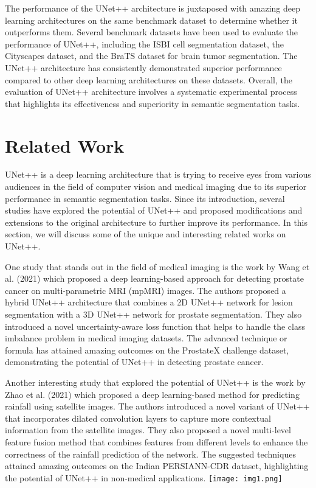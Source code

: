 \documentclass[conference]{IEEEtran}
\begin{document}
The performance of the UNet++ architecture is juxtaposed with amazing deep learning architectures on the same benchmark dataset to determine whether it outperforms them. Several benchmark datasets have been used to evaluate the performance of UNet++, including the ISBI cell segmentation dataset, the Cityscapes dataset, and the BraTS dataset for brain tumor segmentation. The UNet++ architecture has consistently demonstrated superior performance compared to other deep learning architectures on these datasets. Overall, the evaluation of UNet++ architecture involves a systematic experimental process that highlights its effectiveness and superiority in semantic segmentation tasks.

\section{Related Work}
UNet++ is a deep learning architecture that is trying to receive eyes from various audiences in the field of computer vision and medical imaging due to its superior performance in semantic segmentation tasks. Since its introduction, several studies have explored the potential of UNet++ and proposed modifications and extensions to the original architecture to further improve its performance. In this section, we will discuss some of the unique and interesting related works on UNet++.


One study that stands out in the field of medical imaging is the work by Wang et al. (2021) which proposed a deep learning-based approach for detecting prostate cancer on multi-parametric MRI (mpMRI) images. The authors proposed a hybrid UNet++ architecture that combines a 2D UNet++ network for lesion segmentation with a 3D UNet++ network for prostate segmentation. They also introduced a novel uncertainty-aware loss function that helps to handle the class imbalance problem in medical imaging datasets. The advanced technique or formula has attained amazing outcomes on the ProstateX challenge dataset, demonstrating the potential of UNet++ in detecting prostate cancer.

Another interesting study that explored the potential of UNet++ is the work by Zhao et al. (2021) which proposed a deep learning-based method for predicting rainfall using satellite images. The authors introduced a novel variant of UNet++ that incorporates dilated convolution layers to capture more contextual information from the satellite images. They also proposed a novel multi-level feature fusion method that combines features from different levels to enhance the correctness of the rainfall prediction of the network. The suggested techniques attained amazing outcomes on the Indian PERSIANN-CDR dataset, highlighting the potential of UNet++ in non-medical applications.
\texttt{[image: img1.png]}
\end{document}
